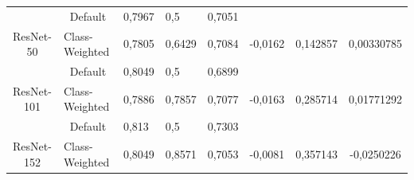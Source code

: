 \begin{table}[hbtp]
\begin{center}
{\begin{tabular}{|c|c|lll|ccc|}
    															 & Default                                                   & \multicolumn{1}{l|}{0,7967}  & \multicolumn{1}{l|}{0,5}    & 0,7051                   & \multicolumn{1}{c|}{}                          & \multicolumn{1}{c|}{}                           &                              \\ \cline{2-5}
    		\multirow{-2}{*}{ResNet-50}                          & \multicolumn{1}{l|}{Class-Weighted}                       & \multicolumn{1}{l|}{0,7805}  & \multicolumn{1}{l|}{0,6429} & 0,7084                   & \multicolumn{1}{c|}{\multirow{-2}{*}{-0,0162}} & \multicolumn{1}{c|}{\multirow{-2}{*}{0,142857}} & \multirow{-2}{*}{0,00330785} \\ \hline
    															 & Default                                                   & \multicolumn{1}{l|}{0,8049}  & \multicolumn{1}{l|}{0,5}    & 0,6899                   & \multicolumn{1}{c|}{}                          & \multicolumn{1}{c|}{}                           &                              \\ \cline{2-5}
    		\multirow{-2}{*}{ResNet-101}                         & \multicolumn{1}{l|}{Class-Weighted}                       & \multicolumn{1}{l|}{0,7886}  & \multicolumn{1}{l|}{0,7857} & 0,7077                   & \multicolumn{1}{c|}{\multirow{-2}{*}{-0,0163}} & \multicolumn{1}{c|}{\multirow{-2}{*}{0,285714}} & \multirow{-2}{*}{0,01771292} \\ \hline
    															 & Default                                                   & \multicolumn{1}{l|}{0,813}   & \multicolumn{1}{l|}{0,5}    & 0,7303                   & \multicolumn{1}{c|}{}                          & \multicolumn{1}{c|}{}                           &                              \\ \cline{2-5}
    		\multirow{-2}{*}{ResNet-152}                         & \multicolumn{1}{l|}{Class-Weighted}                       & \multicolumn{1}{l|}{0,8049}  & \multicolumn{1}{l|}{0,8571} & 0,7053                   & \multicolumn{1}{c|}{\multirow{-2}{*}{-0,0081}} & \multicolumn{1}{c|}{\multirow{-2}{*}{0,357143}} & \multirow{-2}{*}{-0,0250226} \\ \hline
    		\end{tabular}
        }
	\end{center}
\end{table}

